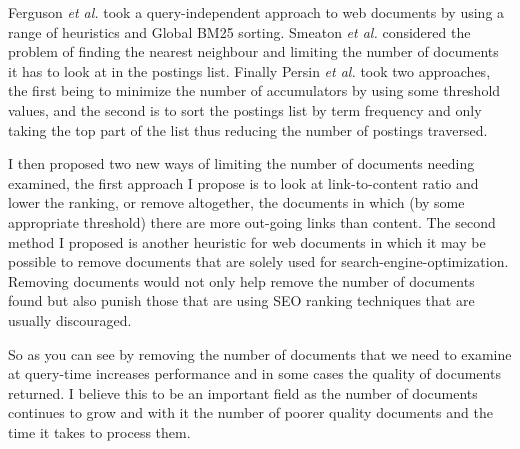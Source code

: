 \documentclass{acm_proc_article-sp}
\begin{document}
Ferguson \emph{et al.} took a query-independent approach to web documents by using a range of heuristics and Global BM25 sorting. Smeaton \emph{et al.} considered the problem of finding the nearest neighbour and limiting the number of documents it has to look at in the postings list. Finally Persin \emph{et al.} took two approaches, the first being to minimize the number of accumulators by using some threshold values, and the second is to sort the postings list by term frequency and only taking the top part of the list thus reducing the number of postings traversed. 

I then proposed two new ways of limiting the number of documents needing examined, the first approach I propose is to look at link-to-content ratio and lower the ranking, or remove altogether, the documents in which (by some appropriate threshold) there are more out-going links than content. The second method I proposed is another heuristic for web documents in which it may be possible to remove documents that are solely used for search-engine-optimization. Removing documents would not only help remove the number of documents found but also punish those that are using SEO ranking techniques that are usually discouraged.

So as you can see by removing the number of documents that we need to examine at query-time increases performance and in some cases the quality of documents returned. I believe this to be an important field as the number of documents continues to grow and with it the number of poorer quality documents and the time it takes to process them.


 

\balancecolumns
\end{document}
